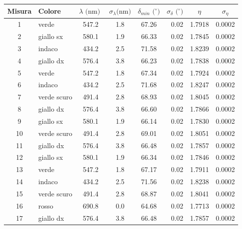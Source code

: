 \begin{table}[!htbp]
    {\par\centering
    \begin{tabular}{clcccrcc}
        \hline
            Misura &
            Colore & 
            $\lambda \text{ (nm) }$ & 
            $\sigma_{\lambda} \text{(nm)}$ & 
            $\delta_{min} \text{ ($^{\circ}$)}$ & 
            $\sigma_{\delta} \text{ ($^{\circ}$)}$ & 
            $\eta$ &
            $\sigma_{\eta}$ \\
        \hline
        1   &   verde        &   547.2  & 1.8 &  67.26 &   0.02  & 1.7918 & 0.0002  \\
        2   &   giallo sx    &   580.1  & 1.9 &  66.33 &   0.02  & 1.7845 & 0.0002  \\
        3   &   indaco       &   434.2  & 2.5 &  71.58 &   0.02  & 1.8239 & 0.0002  \\
        4   &   giallo dx    &   576.4  & 3.8 &  66.23 &   0.02  & 1.7838 & 0.0002  \\
        5   &   verde        &   547.2  & 1.8 &  67.34 &   0.02  & 1.7924 & 0.0002  \\
        6   &   indaco       &   434.2  & 2.5 &  71.68 &   0.02  & 1.8247 & 0.0002  \\
        7   &   verde scuro  &   491.4  & 2.8 &  68.93 &   0.02  & 1.8045 & 0.0002  \\
        8   &   giallo dx    &   576.4  & 3.8 &  66.60 &   0.02  & 1.7866 & 0.0002  \\
        9   &   giallo sx    &   580.1  & 1.9 &  66.14 &   0.02  & 1.7830 & 0.0002  \\
        10  &   verde scuro  &   491.4  & 2.8 &  69.01 &   0.02  & 1.8051 & 0.0002  \\
        11  &   giallo dx    &   576.4  & 3.8 &  66.48 &   0.02  & 1.7857 & 0.0002  \\
        12  &   giallo sx    &   580.1  & 1.9 &  66.34 &   0.02  & 1.7846 & 0.0002  \\
        13  &   verde        &   547.2  & 1.8 &  67.17 &   0.02  & 1.7911 & 0.0002  \\
        14  &   indaco       &   434.2  & 2.5 &  71.56 &   0.02  & 1.8238 & 0.0002  \\
        15  &   verde scuro  &   491.4  & 2.8 &  68.87 &   0.02  & 1.8041 & 0.0002  \\
        16  &   rosso        &   690.8  & 0.0 &  64.68 &   0.02  & 1.7713 & 0.0002  \\
        17  &   giallo dx    &   576.4  & 3.8 &  66.48 &   0.02  & 1.7857 & 0.0002  \\

\end{tabular}}
\end{table}
